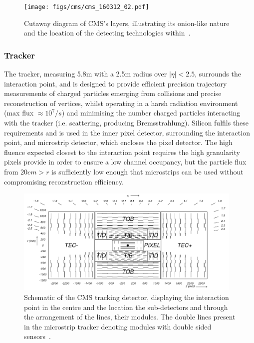 \begin{figure}[htbp]
\begin{center}
\texttt{[image: figs/cms/cms\_160312\_02.pdf]}
\caption{Cutaway diagram of CMS’s layers, illustrating its onion-like nature and the location of the detecting technologies within~\cite{Sakuma:2013jqa}.}
\label{fig:cern-accelerator-complex}
\end{center}
\end{figure}

\subsubsection{Tracker}\label{subsubsec:tracker}
The tracker, measuring 5.8m with a 2.5m radius over $|\eta| < 2.5$, surrounds the interaction point, and is designed to provide efficient precision trajectory measurements of charged particles emerging from collisions and precise reconstruction of vertices, whilst operating in a harsh radiation environment (max flux $\approx 10^{7}/s$) and minimising the number charged particles interacting with the tracker (i.e. scattering, producing Bremsstrahlung).
Silicon fulfils these requirements and is used in the inner pixel detector, surrounding the interaction point, and microstrip detector, which encloses the pixel detector.
The high fluence expected closest to the interaction point requires the high granularity pixels provide in order to ensure a low channel occupancy, but the particle flux from $20cm > r$ is sufficiently low enough that microstrips can be used without compromising reconstruction efficiency.

\begin{figure}[htbp]
\begin{center}
\includegraphics[width=0.97\textwidth]{figs/cms/fig_cmstracker.png}
\caption{Schematic of the CMS tracking detector, displaying the interaction point in the centre and the location the sub-detectors and through the arrangement of the lines, their modules. The double lines present in the microstrip tracker denoting modules with double sided sensors~\cite{Sprenger:2010ss}.}
\label{fig:tracker}
\end{center}
\end{figure}

